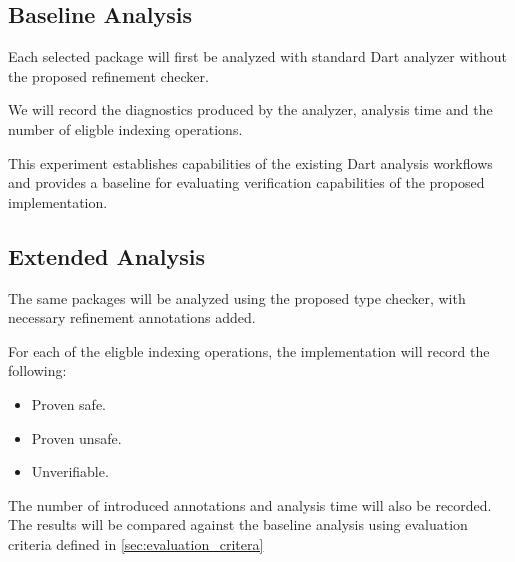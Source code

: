 \subsection{Baseline Analysis}
Each selected package will first be analyzed with standard Dart analyzer without
the proposed refinement checker.

We will record the diagnostics produced by the analyzer, analysis time 
and the number of eligble indexing operations.

This experiment establishes capabilities of the existing Dart analysis workflows and 
provides a baseline for evaluating verification capabilities of the proposed implementation.

\subsection{Extended Analysis}
The same packages will be analyzed using the proposed type checker, with necessary 
refinement annotations added.

For each of the eligble indexing operations, the implementation will record the following:
\begin{itemize}
    \item Proven safe.
    \item Proven unsafe.
    \item Unverifiable.
\end{itemize}
The number of introduced annotations and analysis time will also be recorded.\\
The results will be compared against the baseline analysis using 
evaluation criteria defined in \ref{sec:evaluation_critera}




